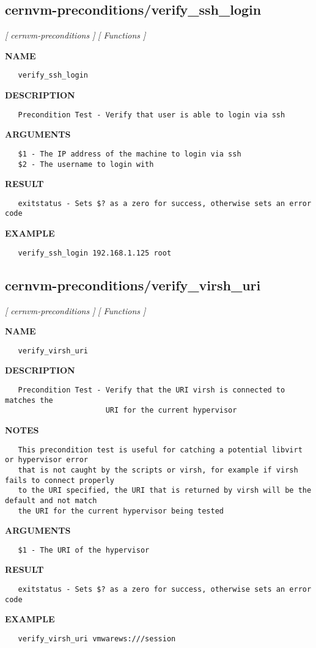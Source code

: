 \subsection{cernvm-preconditions/verify\_ssh\_login}
\textsl{[ cernvm-preconditions ]}
\textsl{[ Functions ]}

\label{ch:robo13}
\label{ch:cernvm_preconditions_verify_ssh_login}
\textbf{NAME}
\begin{verbatim}
   verify_ssh_login
\end{verbatim}
\textbf{DESCRIPTION}
\begin{verbatim}
   Precondition Test - Verify that user is able to login via ssh
\end{verbatim}
\textbf{ARGUMENTS}
\begin{verbatim}
   $1 - The IP address of the machine to login via ssh
   $2 - The username to login with
\end{verbatim}
\textbf{RESULT}
\begin{verbatim}
   exitstatus - Sets $? as a zero for success, otherwise sets an error code
\end{verbatim}
\textbf{EXAMPLE}
\begin{verbatim}
   verify_ssh_login 192.168.1.125 root
\end{verbatim}
\newpage
\subsection{cernvm-preconditions/verify\_virsh\_uri}
\textsl{[ cernvm-preconditions ]}
\textsl{[ Functions ]}

\label{ch:robo14}
\label{ch:cernvm_preconditions_verify_virsh_uri}
\textbf{NAME}
\begin{verbatim}
   verify_virsh_uri
\end{verbatim}
\textbf{DESCRIPTION}
\begin{verbatim}
   Precondition Test - Verify that the URI virsh is connected to matches the
                       URI for the current hypervisor 
\end{verbatim}
\textbf{NOTES}
\begin{verbatim}
   This precondition test is useful for catching a potential libvirt or hypervisor error
   that is not caught by the scripts or virsh, for example if virsh fails to connect properly
   to the URI specified, the URI that is returned by virsh will be the default and not match
   the URI for the current hypervisor being tested
\end{verbatim}
\textbf{ARGUMENTS}
\begin{verbatim}
   $1 - The URI of the hypervisor
\end{verbatim}
\textbf{RESULT}
\begin{verbatim}
   exitstatus - Sets $? as a zero for success, otherwise sets an error code
\end{verbatim}
\textbf{EXAMPLE}
\begin{verbatim}
   verify_virsh_uri vmwarews:///session
\end{verbatim}
\newpage
